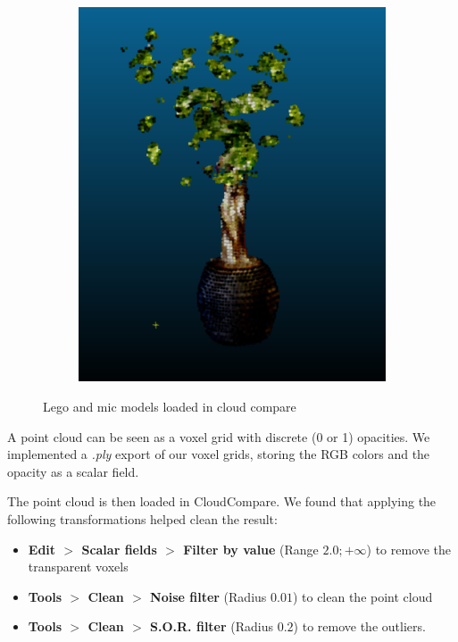 \documentclass{article}
\begin{document}
\begin{figure}[!h]
\begin{subfigure}{.24\textwidth}
\end{subfigure}
\begin{subfigure}{.24\textwidth}
  \centering
  \includegraphics[width=\linewidth]{figs/pc/ficusc.png}  
\end{subfigure}
     \caption{Lego and mic models loaded in cloud compare}
    \label{fig:cc}
\end{figure}

A point cloud can be seen as a voxel grid with discrete (0 or 1) opacities. We implemented a \textit{.ply} export of our voxel grids, storing the RGB colors and the opacity as a scalar field. 

The point cloud is then loaded in CloudCompare. We found that applying the following transformations helped clean the result:

\begin{itemize}
\item \textbf{Edit $>$ Scalar fields $>$ Filter by value} (Range $2.0; +\infty$) to remove the transparent voxels
\item \textbf{Tools $>$ Clean $>$ Noise filter} (Radius $0.01$) to clean the point cloud
\item \textbf{Tools $>$ Clean $>$ S.O.R. filter} (Radius $0.2$) to remove the outliers.
\end{itemize}
\end{document}
